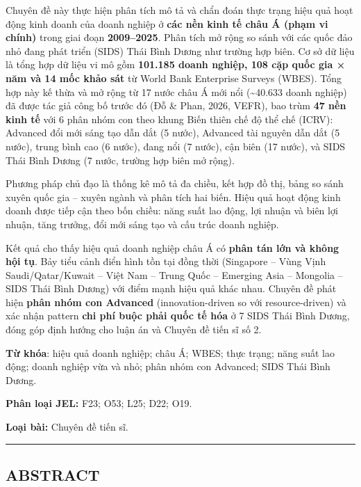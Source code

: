 \documentclass[12pt,a4paper]{article}
\begin{document}
Chuyên đề này thực hiện phân tích mô tả và chẩn đoán thực trạng hiệu quả
hoạt động kinh doanh của doanh nghiệp ở \textbf{các nền kinh tế châu Á
(phạm vi chính)} trong giai đoạn \textbf{2009--2025}. Phân tích mở rộng
so sánh với các quốc đảo nhỏ đang phát triển (SIDS) Thái Bình Dương như
trường hợp biên. Cơ sở dữ liệu là tổng hợp dữ liệu vi mô gồm
\textbf{101.185 doanh nghiệp, 108 cặp quốc gia × năm và 14 mốc khảo sát}
từ World Bank Enterprise Surveys (WBES). Tổng hợp này kế thừa và mở rộng
từ 17 nước châu Á mới nổi (\textasciitilde40.633 doanh nghiệp) đã được
tác giả công bố trước đó (Đỗ \& Phan, 2026, VEFR), bao trùm \textbf{47
nền kinh tế} với 6 phân nhóm con theo khung Biến thiên chế độ thể chế
(ICRV): Advanced đổi mới sáng tạo dẫn dắt (5 nước), Advanced tài nguyên
dẫn dắt (5 nước), trung bình cao (6 nước), đang nổi (7 nước), cận biên
(17 nước), và SIDS Thái Bình Dương (7 nước, trường hợp biên mở rộng).

Phương pháp chủ đạo là thống kê mô tả đa chiều, kết hợp đồ thị, bảng so
sánh xuyên quốc gia -- xuyên ngành và phân tích hai biến. Hiệu quả hoạt
động kinh doanh được tiếp cận theo bốn chiều: năng suất lao động, lợi
nhuận và biên lợi nhuận, tăng trưởng, đổi mới sáng tạo và cấu trúc doanh
nghiệp.

Kết quả cho thấy hiệu quả doanh nghiệp châu Á có \textbf{phân tán lớn và
không hội tụ}. Bảy tiểu cảnh điển hình tồn tại đồng thời (Singapore --
Vùng Vịnh Saudi/Qatar/Kuwait -- Việt Nam -- Trung Quốc -- Emerging Asia
-- Mongolia -- SIDS Thái Bình Dương) với điểm mạnh hiệu quả khác nhau.
Chuyên đề phát hiện \textbf{phân nhóm con Advanced} (innovation-driven
so với resource-driven) và xác nhận pattern \textbf{chi phí buộc phải
quốc tế hóa} ở 7 SIDS Thái Bình Dương, đóng góp định hướng cho luận án
và Chuyên đề tiến sĩ số 2.

\textbf{Từ khóa}: hiệu quả doanh nghiệp; châu Á; WBES; thực trạng; năng
suất lao động; doanh nghiệp vừa và nhỏ; phân nhóm con Advanced; SIDS
Thái Bình Dương.

\textbf{Phân loại JEL:} F23; O53; L25; D22; O19.

\textbf{Loại bài:} Chuyên đề tiến sĩ.

\begin{center}\rule{0.5\linewidth}{0.5pt}\end{center}

\hypertarget{abstract}{%
\subsection{ABSTRACT}\label{abstract}}
\end{document}
